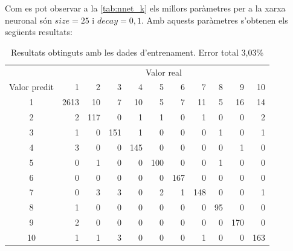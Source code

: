 \documentclass[a4paper]{article}
\begin{document}
Com es pot observar a la \autoref{tab:nnet_k} els millors paràmetres per a la xarxa neuronal són $size = 25$ i $decay = 0,1$. Amb aquests paràmetres s'obtenen els següents resultats:

\begin{table}[H]
	\centering
	\def\arraystretch{1.2}
	\begin{tabular}{|c|rrrrrrrrrr|}
		\hline
		& \multicolumn{10}{c|}{Valor real} \\
		Valor predit & 1 & 2 & 3 & 4 & 5 & 6 & 7 & 8 & 9 & 10 \\
		\hline
		1 & 2613 & 10 & 7 & 10 & 5 & 7 & 11 & 5 & 16 & 14 \\
		2 & 2 & 117 & 0 & 1 & 1 & 0 & 1 & 0 & 0 & 2 \\
		3 & 1 & 0 & 151 & 1 & 0 & 0 & 0 & 1 & 0 & 1 \\
		4 & 3 & 0 & 0 & 145 & 0 & 0 & 0 & 0 & 1 & 0 \\
		5 & 0 & 1 & 0 & 0 & 100 & 0 & 0 & 1 & 0 & 0 \\
		6 & 0 & 0 & 0 & 0 & 0 & 167 & 0 & 0 & 0 & 0 \\
		7 & 0 & 3 & 3 & 0 & 2 & 1 & 148 & 0 & 0 & 1 \\
		8 & 1 & 0 & 0 & 0 & 0 & 0 & 0 & 95 & 0 & 0 \\
		9 & 2 & 0 & 0 & 0 & 0 & 0 & 0 & 0 & 170 & 0 \\
		10 & 1 & 1 & 3 & 0 & 0 & 0 & 1 & 0 & 0 & 163 \\
		\hline
	\end{tabular}
	\caption{Resultats obtinguts amb les dades d'entrenament. Error total 3,03\%}
	\label{tab:nnet_k1}
\end{table}

\begin{figure}[H]
	\centering
\end{figure}
\end{document}
